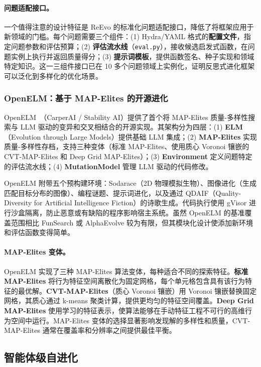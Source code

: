\paragraph{问题适配接口。}
一个值得注意的设计特征是 ReEvo 的标准化问题适配接口，降低了将框架应用于新领域的门槛。每个问题需要三个组件：(1) Hydra/YAML 格式的\textbf{配置文件}，指定问题参数和评估预算；(2) \textbf{评估流水线}（\texttt{eval.py}），接收候选启发式函数，在问题实例上执行并返回质量得分；(3) \textbf{提示词模板}，提供函数签名、种子实现和领域特定知识。这一三组件接口已在 10 多个问题领域上实例化，证明反思式进化框架可以泛化到多样化的优化场景。


\subsubsection{OpenELM：基于 MAP-Elites 的开源进化}

OpenELM~\citep{carperai2023openelm}（CarperAI / Stability AI）提供了首个将 MAP-Elites 质量-多样性搜索与 LLM 驱动的变异和交叉相结合的开源实现。其架构分为四层：(1) \textbf{ELM}（Evolution through Large Models）提供基础 LLM 集成；(2) \textbf{MAP-Elites} 实现质量-多样性存档，支持三种变体（标准 MAP-Elites、使用质心 Voronoi 镶嵌的 CVT-MAP-Elites 和 Deep Grid MAP-Elites）；(3) \textbf{Environment} 定义问题特定的评估流水线；(4) \textbf{MutationModel} 管理 LLM 驱动的代码修改。

OpenELM 附带五个预构建环境：Sodarace（2D 物理模拟生物）、图像进化（生成匹配目标分布的图像）、编程谜题、提示词进化，以及通过 QDAIF（Quality-Diversity for Artificial Intelligence Fiction）的诗歌生成。代码执行使用 gVisor 进行沙盒隔离，防止恶意或有缺陷的程序影响宿主系统。虽然 OpenELM 的基准覆盖范围相比 FunSearch 或 AlphaEvolve 较为有限，但其模块化设计使添加新环境和评估函数变得简单。

\paragraph{MAP-Elites 变体。}
OpenELM 实现了三种 MAP-Elites 算法变体，每种适合不同的探索特征。\textbf{标准 MAP-Elites} 将行为特征空间离散化为固定网格，每个单元格包含具有该行为特征的最优解。\textbf{CVT-MAP-Elites}（质心 Voronoi 镶嵌）用 Voronoi 镶嵌替换固定网格，其质心通过 k-means 聚类计算，提供更均匀的特征空间覆盖。\textbf{Deep Grid MAP-Elites} 使用学习的特征表示，使算法能够在手动特征工程不可行的高维行为空间中运行。MAP-Elites 变体的选择显著影响发现解的多样性和质量，CVT-MAP-Elites 通常在覆盖率和分辨率之间提供最佳平衡。


\subsection{智能体级自进化}\label{sec:ch4-agent-evo}

